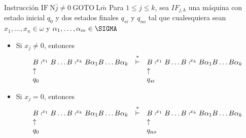 \begin{frame}
  \begin{block}{Instrucción $\mathrm{IF} \ \mathrm{N}\bar{j} \not = 0 \ \mathrm{GOTO} \ \mathrm{L}\bar{m}$}
    \PN Para $1 \leq j \leq k$, sea $IF_{j,k}$ una máquina con estado inicial $q_{0}$ y dos estados finales $q_{si}$ y
    $q_{no}$ tal que cualesquiera sean $x_{1}, \dotsc, x_{n} \in \omega$ y $\alpha_{1}, \dotsc,\alpha_{m} \in \SIGMA$
    \begin{itemize}
      \item Si $x_{j} \neq 0$, entonces
      \[
        \begin{array}{lcl}
          B \shortmid^{x_{1}} B \dotsc B \shortmid^{x_{k}} B \alpha_{1} B \dotsc B \alpha_{k} &\overset{\ast}{\vdash}& B
            \shortmid^{x_{1}} B \dotsc B \shortmid^{x_{k}} B \alpha_{1} B \dotsc B \alpha_{k} \\
          \uparrow && \uparrow \\
          q_{0} && q_{si}
        \end{array}
      \]

      \item Si $x_{j} = 0$, entonces
      \[
        \begin{array}{lcl}
          B \shortmid^{x_{1}} B \dotsc B \shortmid^{x_{k}} B \alpha_{1} B \dotsc B \alpha_{k} &\overset{\ast}{\vdash}& B
            \shortmid^{x_{1}} B \dotsc B \shortmid^{x_{k}} B \alpha_{1} B \dotsc B \alpha_{k} \\
          \uparrow && \uparrow \\
          q_{0} && q_{no}
        \end{array}
      \]
    \end{itemize}
  \end{block}
\end{frame}
